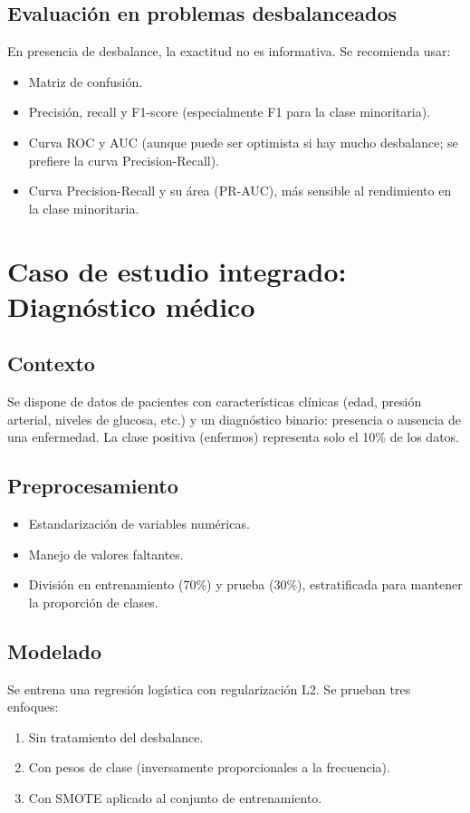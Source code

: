 \documentclass[12pt,a4paper,openany,oneside]{book}
\begin{document}
\subsection{Evaluación en problemas desbalanceados}
En presencia de desbalance, la exactitud no es informativa. Se recomienda usar:
\begin{itemize}
    \item Matriz de confusión.
    \item Precisión, recall y F1-score (especialmente F1 para la clase minoritaria).
    \item Curva ROC y AUC (aunque puede ser optimista si hay mucho desbalance; se prefiere la curva Precision-Recall).
    \item Curva Precision-Recall y su área (PR-AUC), más sensible al rendimiento en la clase minoritaria.
\end{itemize}

\section{Caso de estudio integrado: Diagnóstico médico}

\subsection{Contexto}
Se dispone de datos de pacientes con características clínicas (edad, presión arterial, niveles de glucosa, etc.) y un diagnóstico binario: presencia o ausencia de una enfermedad. La clase positiva (enfermos) representa solo el 10\% de los datos.

\subsection{Preprocesamiento}
\begin{itemize}
    \item Estandarización de variables numéricas.
    \item Manejo de valores faltantes.
    \item División en entrenamiento (70\%) y prueba (30\%), estratificada para mantener la proporción de clases.
\end{itemize}

\subsection{Modelado}
Se entrena una regresión logística con regularización L2. Se prueban tres enfoques:
\begin{enumerate}
    \item Sin tratamiento del desbalance.
    \item Con pesos de clase (inversamente proporcionales a la frecuencia).
    \item Con SMOTE aplicado al conjunto de entrenamiento.
\end{enumerate}
\end{document}
